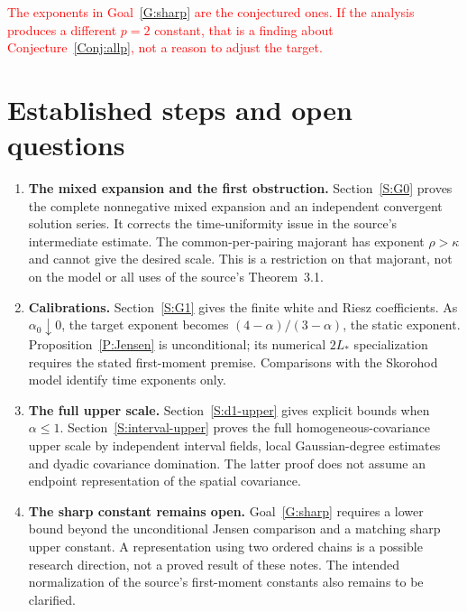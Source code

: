 \documentclass[12pt]{article}
\numberwithin{equation}{section}
\theoremstyle{definition}
\newcommand{\myCmts}[1]{\begin{framed}\noindent\textcolor{red}{#1}\end{framed}}
\begin{document}
\myCmts{The exponents in Goal~\ref{G:sharp} are the conjectured ones. If
the analysis produces a different $p=2$ constant, that is a finding about
Conjecture~\ref{Conj:allp}, not a reason to adjust the target.}

\section{Established steps and open questions}\label{S:route}

\begin{enumerate}[1.]
  \item \textbf{The mixed expansion and the first obstruction.}
    Section~\ref{S:G0} proves the complete nonnegative mixed expansion
    and an independent convergent solution series. It corrects the
    time-uniformity issue in the source's intermediate estimate.
    The common-per-pairing majorant has exponent $\rho>\kappa$ and cannot
    give the desired scale. This is a restriction on that majorant,
    not on the model or all uses of the source's Theorem~3.1.
  \item \textbf{Calibrations.}
    Section~\ref{S:G1} gives the finite white and Riesz coefficients.
    As $\alpha_0\downarrow0$, the target exponent becomes
    $(4-\alpha)/(3-\alpha)$, the static exponent.
    Proposition~\ref{P:Jensen} is unconditional; its numerical
    $2L_*$ specialization requires the stated first-moment premise.
    Comparisons with the Skorohod model identify time exponents only.
  \item \textbf{The full upper scale.}
    Section~\ref{S:d1-upper} gives explicit bounds when $\alpha\le1$.
    Section~\ref{S:interval-upper} proves the full homogeneous-covariance
    upper scale by independent interval fields, local Gaussian-degree
    estimates and dyadic covariance domination. The latter proof does
    not assume an endpoint representation of the spatial covariance.
  \item \textbf{The sharp constant remains open.}
    Goal~\ref{G:sharp} requires a lower bound beyond the unconditional
    Jensen comparison and a matching sharp upper constant. A representation
    using two ordered chains is a possible research direction, not a
    proved result of these notes. The intended normalization of the
    source's first-moment constants also remains to be clarified.
\end{enumerate}


\end{document}
